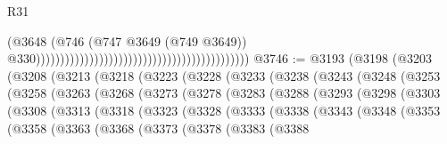 \begin{lexlean}{R31}
\begin{coremodule}
                                                                                        (@3648
                                                                                          (@746
                                                                                            (@747
                                                                                              @3649
                                                                                              (@749
                                                                                                @3649))
                                                                                            @330))))))))))))))))))))))))))))))))))))))))))))
@3746 := @3193
    (@3198
      (@3203
        (@3208
          (@3213
            (@3218
              (@3223
                (@3228
                  (@3233
                    (@3238
                      (@3243
                        (@3248
                          (@3253
                            (@3258
                              (@3263
                                (@3268
                                  (@3273
                                    (@3278
                                      (@3283
                                        (@3288
                                          (@3293
                                            (@3298
                                              (@3303
                                                (@3308
                                                  (@3313
                                                    (@3318
                                                      (@3323
                                                        (@3328
                                                          (@3333
                                                            (@3338
                                                              (@3343
                                                                (@3348
                                                                  (@3353
                                                                    (@3358
                                                                      (@3363
                                                                        (@3368
                                                                          (@3373
                                                                            (@3378
                                                                              (@3383
                                                                                (@3388

\end{coremodule}
\end{lexlean}
